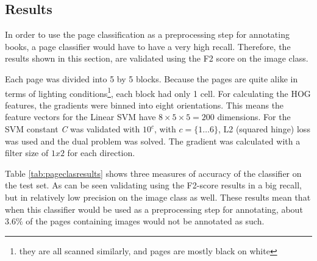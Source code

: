 \subsection{Results}
\label{subsec:pageclasresults}

In order to use the page classification as a preprocessing step for annotating
books, a page classifier would have to have a very high recall. Therefore, the
results shown in this section, are validated using the F2 score on the image
class. 

Each page was divided into 5 by 5 blocks. Because the pages
are quite alike in terms of lighting conditions\footnote{they are all scanned
similarly, and pages are mostly black on white}, each block had only 1 cell. For
calculating the HOG features, the gradients were binned into eight orientations.
This means the feature vectors for the Linear SVM have $8 \times 5 \times 5 =
200$ dimensions. 
For the SVM constant \emph{C} was validated with $10^c$, with $c = \{1 \dots
6\}$, L2 (squared hinge) loss was used and the dual problem was solved. The
gradient was calculated with a filter size of $1x2$ for each direction.


Table \ref{tab:pageclasresults} shows three measures of accuracy of the
classifier on the test set. As can be seen validating using the F2-score
results in a big recall, but in relatively low precision on the image
class as well. These results mean that when this classifier would be used as a
preprocessing step for annotating, about $3.6\%$ of the pages containing images
would not be annotated as such.

